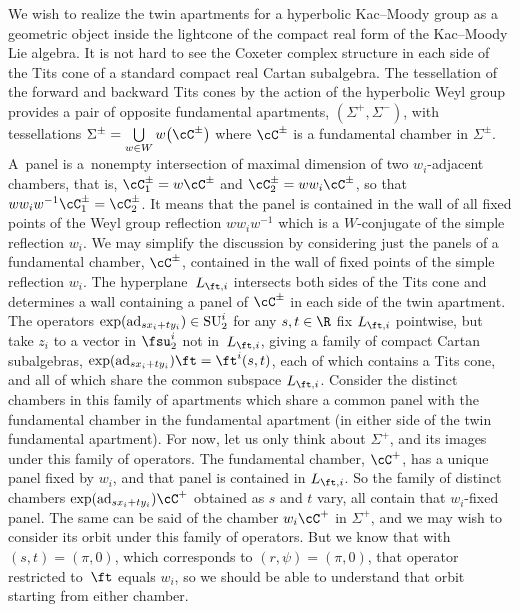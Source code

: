 We wish to realize the twin apartments for a hyperbolic Kac--Moody group as a geometric object inside the lightcone of the compact real form of the Kac--Moody Lie algebra. It is not hard to see the Coxeter complex structure
in each side of the Tits cone of a standard compact real Cartan subalgebra. The tessellation of the forward and backward Tits cones by the action of the hyperbolic Weyl group provides a pair of opposite fundamental apartments, $(\Sigma^+,\Sigma^-)$, with tessellations $\Sigma^\pm = \bigcup\limits_{w\in W} w\big(\cC^\pm\big)$ where $\cC^\pm$ is a fundamental chamber in $\Sigma^\pm$. A~panel is a~nonempty intersection of maximal dimension of two $w_i$-adjacent chambers, that is, $\cC_1^\pm = w\cC^\pm$ and $\cC_2^\pm = w w_i \cC^\pm$, so that $w w_i w^{-1} \cC_1^\pm = \cC_2^\pm$. It means that the panel is contained in the wall of all fixed points of the Weyl group reflection $w w_i w^{-1}$ which is a $W$-conjugate of the simple reflection $w_i$. We may simplify the discussion by considering just the panels of a fundamental chamber, $\cC^\pm$, contained in the wall of fixed points of the simple reflection $w_i$. The hyperplane~$L_{\ft,i}$ intersects both sides of the Tits cone and determines a wall containing a panel of $\cC^\pm$ in each side of the twin apartment. The operators $\exp( {\rm ad}_{sx_i+ty_i})\in {\rm SU}_2^i$ for any $s,t\in\R$ fix $L_{\ft,i}$ pointwise, but take $z_i$ to a vector in $\fsu_2^i$ not in~$L_{\ft,i}$, giving a family of compact Cartan
subalgebras, $\exp( {\rm ad}_{sx_i+ty_i}) \ft = \ft^i(s,t)$, each of which contains a Tits cone, and all of which share the common subspace $L_{\ft,i}$. Consider the distinct chambers in this family of apartments which share a common panel with the fundamental chamber in the fundamental apartment (in either side of the twin fundamental apartment). For now, let us only think about $\Sigma^+$, and its images under this family of operators. The fundamental chamber, $\cC^+$, has a unique panel fixed by $w_i$, and that panel is contained in $L_{\ft,i}$. So the family of distinct chambers $\exp( {\rm ad}_{sx_i+ty_i}) \cC^+$ obtained as $s$ and $t$ vary, all contain that $w_i$-fixed panel. The same can be said of the chamber $w_i \cC^+$ in $\Sigma^+$, and we may wish to consider its orbit under this family of operators. But we know that with $(s,t) = (\pi,0)$, which corresponds to $(r,\psi) = (\pi, 0)$, that operator restricted to~$\ft$
equals $w_i$, so we should be able to understand that orbit starting from either chamber.

